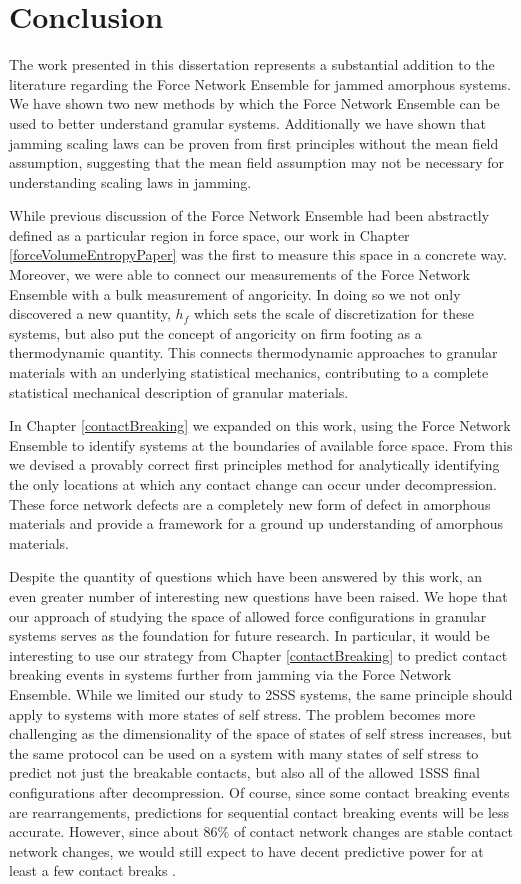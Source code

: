 \chapter{Conclusion}

The work presented in this dissertation represents a substantial addition to the literature regarding the Force Network Ensemble for jammed amorphous systems. We have shown two new methods by which the Force Network Ensemble can be used to better understand granular systems. Additionally we have shown that jamming scaling laws can be proven from first principles without the mean field assumption, suggesting that the mean field assumption may not be necessary for understanding scaling laws in jamming.

While previous discussion of the Force Network Ensemble had been abstractly defined as a particular region in force space, our work in Chapter \ref{forceVolumeEntropyPaper} was the first to measure this space in a concrete way. Moreover, we were able to connect our measurements of the Force Network Ensemble with a bulk measurement of angoricity. In doing so we not only discovered a new quantity, $h_f$ which sets the scale of discretization for these systems, but also put the concept of angoricity on firm footing as a thermodynamic quantity. This connects thermodynamic approaches to granular materials with an underlying statistical mechanics, contributing to a complete statistical mechanical description of granular materials.

In Chapter \ref{contactBreaking} we expanded on this work, using the Force Network Ensemble to identify systems at the boundaries of available force space. From this we devised a provably correct first principles method for analytically identifying the only locations at which any contact change can occur under decompression. These force network defects are a completely new form of defect in amorphous materials and provide a framework for a ground up understanding of amorphous materials.

Despite the quantity of questions which have been answered by this work, an even greater number of interesting new questions have been raised. We hope that our approach of studying the space of allowed force configurations in granular systems serves as the foundation for future research. In particular, it would be interesting to use our strategy from Chapter \ref{contactBreaking} to predict contact breaking events in systems further from jamming via the Force Network Ensemble. While we limited our study to 2SSS systems, the same principle should apply to systems with more states of self stress. The problem becomes more challenging as the dimensionality of the space of states of self stress increases, but the same protocol can be used on a system with many states of self stress to predict not just the breakable contacts, but also all of the allowed 1SSS final configurations after decompression. Of course, since some contact breaking events are rearrangements, predictions for sequential contact breaking events will be less accurate. However, since about $86\%$ of contact network changes are stable contact network changes, we would still expect to have decent predictive power for at least a few contact breaks \cite{morse_differences_2020,tuckman_contact_2020}.

